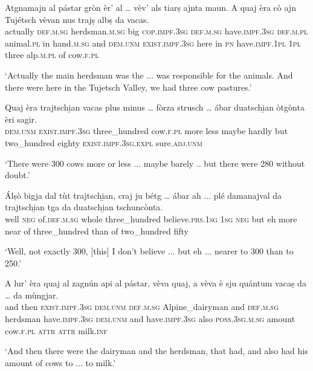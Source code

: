 \begin{linenumbers}
	\gll   Atgnamajn al pástar gròn èr’ al … vèv’ als tiarṣ ajnta maun. A quaj èra cò ajn Tujétsch vèvan nus trajṣ albṣ da vacas.   \\
actually \textsc{def.m.sg} herdsman.\textsc{m.sg} big \textsc{cop.impf.3sg} \textsc{def.m.sg} {} have.\textsc{impf.3sg} \textsc{def.m.pl} animal.\textsc{pl} in hand.\textsc{m.sg} and \textsc{dem.unm} \textsc{exist.impf.3sg} here in \textsc{pn} have.\textsc{impf.1pl} \textsc{1pl} three alp.\textsc{m.pl} of cow.\textsc{f.pl}	\\
\end{linenumbers}
\medskip
\glt `Actually the main herdsman was the ... was responsible for the animals. And there were here in the Tujetsch Valley, we had three cow pastures.'
\medskip

\begin{linenumbers}
	\gll  Quaj èra trajtschi̱an vacas plus minus … fòrza strusch … ábar duatschi̱an òtgònta èri sagir.  \\
	\textsc{dem.unm} \textsc{exist.impf.3sg} three\_hundred cow.\textsc{f.pl} more less {} maybe hardly {} but two\_hundred eighty \textsc{exist.impf.3sg.expl} sure.\textsc{adj.unm} \\
\end{linenumbers}
\medskip
\glt `There were 300 cows more or less ... maybe barely .. but there were 280 without doubt.'
\medskip

\begin{linenumbers}
	\gll Álṣò bigja dal tùt trajtschi̱an, craj ju bétg … ábar ah ... plé damanajval da trajtschi̱an tga da duatschi̱an tschuncònta.   \\
well \textsc{neg} of.\textsc{def.m.sg} whole three\_hundred believe.\textsc{prs.1sg} \textsc{1sg} \textsc{neg} {} but eh {} more near of three\_hundred than of two\_hundred fifty\\
\end{linenumbers}
\medskip
\glt `Well, not exactly 300, [this] I don't believe ... but eh ... nearer to 300 than to 250.'
\medskip

\begin{linenumbers}
	\gll A lur’ èra quaj al zagnún api al pástar, vèva quaj, a vèva è sju quántum vacaṣ da … da mùngjar.\\
	and then \textsc{exist.impf.3sg} \textsc{dem.unm} \textsc{def.m.sg} Alpine\_dairyman and \textsc{def.m.sg} herdsman have.\textsc{impf.3sg } \textsc{dem.unm} and have.\textsc{impf.3sg} also \textsc{poss.3sg.m.sg} amount cow.\textsc{f.pl} \textsc{attr} {} \textsc{attr} milk.\textsc{inf}\\
\end{linenumbers}
\medskip
\glt `And then there were the dairyman and the herdsman, that had, and also had his amount of cows to ... to milk.'
\medskip

